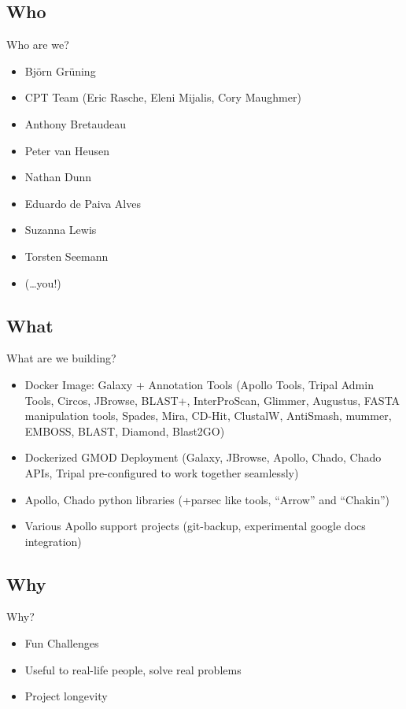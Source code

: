 \documentclass[12pt]{phage3slides} %
\begin{document}
\subsection{Who}
\begin{frame}{Who are we?}
    \begin{itemize}
        \item Bj\"orn Gr\"uning
        \item CPT Team (Eric Rasche, Eleni Mijalis, Cory Maughmer)
        \item Anthony Bretaudeau
        \item Peter van Heusen
        \item Nathan Dunn
        \item Eduardo de Paiva Alves
        \item Suzanna Lewis
        \item Torsten Seemann
        \item (\ldots you!)
    \end{itemize}
\end{frame}

\subsection{What}
\begin{frame}{What are we building?}
    \begin{itemize}
        \item Docker Image: Galaxy + Annotation Tools {\color{gray}(Apollo Tools, Tripal Admin Tools, Circos, JBrowse, BLAST+, InterProScan, Glimmer, Augustus, FASTA manipulation tools, Spades, Mira, CD-Hit, ClustalW, AntiSmash, mummer, EMBOSS, BLAST, Diamond, Blast2GO)}
        \item Dockerized GMOD Deployment {\color{gray}(Galaxy, JBrowse, Apollo, Chado, Chado APIs, Tripal pre-configured to work together seamlessly)}
        \item Apollo, Chado python libraries {\color{gray}(+parsec like tools, ``Arrow'' and ``Chakin'')}
        \item Various Apollo support projects {\color{gray}(git-backup, experimental google docs integration)}
    \end{itemize}
\end{frame}

\subsection{Why}
\begin{frame}{Why?}
    \begin{itemize}
        \item Fun Challenges
        \item Useful to real-life people, solve real problems
        \item Project longevity
    \end{itemize}
\end{frame}
\end{document}
